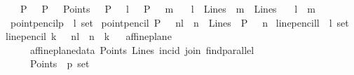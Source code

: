 \begin{isabellebody}
\ \ \ {\isachardoublequoteopen}{\isasymforall}P\ {\isachardot}{\kern0pt}\ \ P\ {\isasymnotin}\ \ Points\ {\isasymor}\ {\isasymnot}\ P\ {\isasymlhd}\ \ l\ {\isasymand}\ \ {\isasymnot}P\ {\isasymlhd}\ \ m{\isachardoublequoteclose}\ \isanewline
\ \ {\isachardoublequoteopen}l\ {\isasymin}\ Lines{\isachardoublequoteclose}\ \ {\isachardoublequoteopen}m\ {\isasymin}\ Lines{\isachardoublequoteclose}\isanewline
\ \ \ {\isachardoublequoteopen}l\ {\isacharbar}{\kern0pt}{\isacharbar}{\kern0pt}\ m{\isachardoublequoteclose}\isanewline
%
\isadelimproof
\ \ %
\endisadelimproof
%
\isatagproof
{}\isamarkupfalse%
%
\endisatagproof
{\isafoldproof}%
%
\isadelimproof
\isanewline
%
\endisadelimproof
\isanewline
{}\isamarkupfalse%
\ point{\isacharunderscore}{\kern0pt}pencil{\isacharcolon}{\kern0pt}{\isacharcolon}{\kern0pt}{\isachardoublequoteopen}{\isacharprime}{\kern0pt}p\ {\isasymRightarrow}\ {\isacharprime}{\kern0pt}l\ set{\isachardoublequoteclose}\ \isanewline
{\isachardoublequoteopen}point{\isacharunderscore}{\kern0pt}pencil\ P\ {\isacharequal}{\kern0pt}\ {\isacharbraceleft}{\kern0pt}\ n{\isacharcolon}{\kern0pt}{\isacharcolon}{\kern0pt}{\isacharprime}{\kern0pt}l\ {\isachardot}{\kern0pt}\ {\isacharparenleft}{\kern0pt}n\ {\isasymin}\ Lines{\isacharparenright}{\kern0pt}\ {\isasymand}\ P\ {\isasymlhd}\ \ n{\isacharbraceright}{\kern0pt}{\isachardoublequoteclose}\isanewline
\isanewline
{}\isamarkupfalse%
\ line{\isacharunderscore}{\kern0pt}pencil{\isacharcolon}{\kern0pt}{\isacharcolon}{\kern0pt}{\isachardoublequoteopen}{\isacharprime}{\kern0pt}l\ {\isasymRightarrow}\ {\isacharprime}{\kern0pt}l\ set{\isachardoublequoteclose}\ \isanewline
{\isachardoublequoteopen}line{\isacharunderscore}{\kern0pt}pencil\ k\ {\isacharequal}{\kern0pt}\ {\isacharbraceleft}{\kern0pt}\ n{\isacharcolon}{\kern0pt}{\isacharcolon}{\kern0pt}{\isacharprime}{\kern0pt}l\ {\isachardot}{\kern0pt}\ n\ {\isacharbar}{\kern0pt}{\isacharbar}{\kern0pt}\ k{\isacharbraceright}{\kern0pt}{\isachardoublequoteclose}\isanewline
\isanewline
{}\isamarkupfalse%
\ \isanewline
\isanewline
{}\isamarkupfalse%
\ affine{\isacharunderscore}{\kern0pt}plane\ {\isacharequal}{\kern0pt}\isanewline
\ \ \ \ \ affine{\isacharunderscore}{\kern0pt}plane{\isacharunderscore}{\kern0pt}data\ Points\ Lines\ incid\ join\ find{\isacharunderscore}{\kern0pt}parallel\isanewline
\ \ \ \ \ \isanewline
\ \ \ \ \ Points\ {\isacharcolon}{\kern0pt}{\isacharcolon}{\kern0pt}\ {\isachardoublequoteopen}{\isacharprime}{\kern0pt}p\ set{\isachardoublequoteclose}\ \isanewline

\end{isabellebody}
